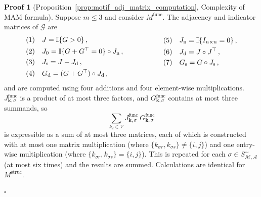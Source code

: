 \documentclass[12pt,draft]{ociamthesis}
\theoremstyle{plain}
\theoremstyle{definition}
\newtheorem{prf}{Proof}[chapter]
\theoremstyle{remark}
\newcommand\bb[1]{\mathbb{#1}}
\newcommand\ca[1]{\mathcal{#1}}
\begin{document}
\pagebreak

\begin{prf}[Proposition~\ref{prop:motif_adj_matrix_computation},
  Complexity of MAM formula]
  \label{proof:motif_adj_matrix_computation}
  Suppose ${m \leq 3}$ and consider $M^\mathrm{func}$. The adjacency and
  indicator matrices of $\ca{G}$ are
  \begin{equation*}
    \begin{aligned}[c]
      &(1) \quad J = \bb{I} \{ G>0 \}\,, \\
      &(2) \quad J_0 = \bb{I} \{ G + G^\top = 0 \} \circ J_\mathrm{n}\,, \\
      &(3) \quad J_\mathrm{s} = J - J_\mathrm{d}\,, \\
      &(4) \quad G_\mathrm{d} = (G + G^\top) \circ J_\mathrm{d} \,,
    \end{aligned}
    \hspace*{2cm}
    \begin{aligned}[c]
      &(5) \quad J_\mathrm{n} = \bb{I} \{I_{n \times n} = 0 \}\,, \\
      &(6) \quad J_\mathrm{d} = J \circ J^\top\,, \\
      &(7) \quad G_\mathrm{s} = G \circ J_\mathrm{s}\,, \\
      &
    \end{aligned}
  \end{equation*}
  and are computed using four additions and four element-wise multiplications.
  $J^\mathrm{func}_{\mathbf{k},\sigma}$ is a product of at most three factors,
  and $G^\mathrm{func}_{\mathbf{k},\sigma}$ contains at most three summands, so
  $$ \sum_{k_2 \in \ca{V}} J^\mathrm{func}_{\mathbf{k},\sigma} \
  G^\mathrm{func}_{\mathbf{k},\sigma} $$
  is expressible as a sum of at most three matrices, each of which is
  constructed with at most one matrix multiplication (where $\{k_{\sigma
  r},k_{\sigma s}\} \neq \{i,j\}$) and one entry-wise multiplication
  (where
  $\{k_{\sigma r},k_{\sigma s}\} = \{i,j\}$). This is repeated for each
  $\sigma
  \in S_\ca{M,A}^\sim$ (at most six times) and the results are summed.
  Calculations are identical for $M^\mathrm{struc}$.

  \hfill $\square$
\end{prf}
\end{document}
